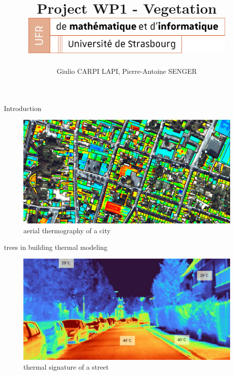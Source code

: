 \documentclass[10pt]{beamer}
\title[WP1]{
 Project WP1 - Vegetation \\
  \vspace{1cm}
    \includegraphics[width=0.8\textwidth]{images/logo_Uni.png}}
\author[senger carpi lapi]{Giulio CARPI LAPI, Pierre-Antoine SENGER}
\begin{document}
\frame{\titlepage}

\begin{frame}{Introduction}

  \begin{figure}[h] %
    \centering
    \includegraphics[width=1\textwidth]{images/thermographie-aerienne.jpg}
    \caption{aerial thermography of a city \cite{thermography}} %
    \label{fig:thermographie} %
  \end{figure}

\end{frame}

\begin{frame}{trees in building thermal modeling}

    \begin{figure}[h] %
      \centering
      \includegraphics[width=1\textwidth]{images/heat_street.png}
      \caption{thermal signature of a street \cite{street thermography}} %
      \label{fig:3d_city_model} %
    \end{figure}

\end{frame}
\end{document}
